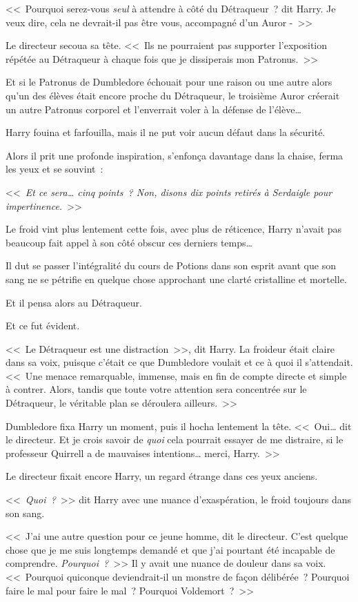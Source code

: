 <<~Pourquoi serez-vous \emph{seul} à attendre à côté du Détraqueur~? dit Harry. Je veux dire, cela ne devrait-il pas être vous, accompagné d'un Auror -~>>

Le directeur secoua sa tête. <<~Ils ne pourraient pas supporter l'exposition répétée au Détraqueur à chaque fois que je dissiperais mon Patronus.~>>

Et si le Patronus de Dumbledore échouait pour une raison ou une autre alors qu'un des élèves était encore proche du Détraqueur, le troisième Auror créerait un autre Patronus corporel et l'enverrait voler à la défense de l'élève…

Harry fouina et farfouilla, mais il ne put voir aucun défaut dans la sécurité.

Alors il prit une profonde inspiration, s'enfonça davantage dans la chaise, ferma les yeux et se souvint~:

<<~\emph{Et ce sera… cinq points~? Non, disons dix points retirés à Serdaigle pour impertinence.}~>>

Le froid vint plus lentement cette fois, avec plus de réticence, Harry n'avait pas beaucoup fait appel à son côté obscur ces derniers temps…

Il dut se passer l'intégralité du cours de Potions dans son esprit avant que son sang ne se pétrifie en quelque chose approchant une clarté cristalline et mortelle.

Et il pensa alors au Détraqueur.

Et ce fut évident.

<<~Le Détraqueur est une distraction~>>, dit Harry. La froideur était claire dans sa voix, puisque c'était ce que Dumbledore voulait et ce à quoi il s'attendait. <<~Une menace remarquable, immense, mais en fin de compte directe et simple à contrer. Alors, tandis que toute votre attention sera concentrée sur le Détraqueur, le véritable plan se déroulera ailleurs.~>>

Dumbledore fixa Harry un moment, puis il hocha lentement la tête. <<~Oui… dit le directeur. Et je crois savoir de \emph{quoi} cela pourrait essayer de me distraire, si le professeur Quirrell a de mauvaises intentions… merci, Harry.~>>

Le directeur fixait encore Harry, un regard étrange dans ces yeux anciens.

<<~\emph{Quoi~?}~>> dit Harry avec une nuance d'exaspération, le froid toujours dans son sang.

<<~J'ai une autre question pour ce jeune homme, dit le directeur. C'est quelque chose que je me suis longtemps demandé et que j'ai pourtant été incapable de comprendre. \emph{Pourquoi~?}~>> Il y avait une nuance de douleur dans sa voix. <<~Pourquoi quiconque deviendrait-il un monstre de façon délibérée~? Pourquoi faire le mal pour faire le mal~? Pourquoi Voldemort~?~>>

